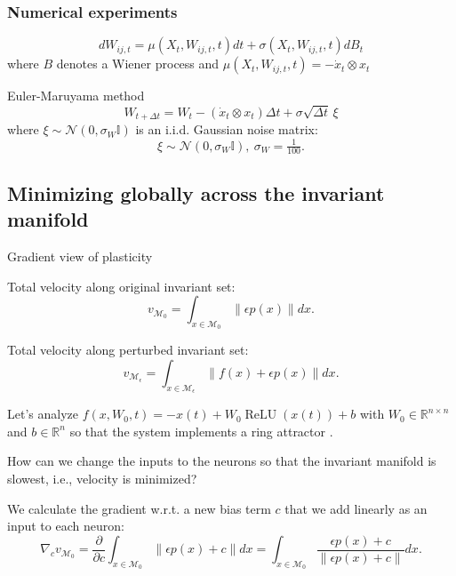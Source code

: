 \documentclass{article}
\theoremstyle{definition} \newtheorem{definition}{Definition}
\theoremstyle{remark} \newtheorem{remark}{Remark}
\newcommand{\reals}{\mathbb{R}}
\newcommand{\manifold}{\mathcal{M}}
\newcommand{\relu}{\operatorname{ReLU}}
\newcounter{ct}
\begin{document}
\subsubsection{Numerical experiments}
\begin{equation}
dW_{ij,t} = \mu(X_t, W_{ij,t}, t)dt + \sigma(X_t, W_{ij,t}, t)dB_t
\end{equation}
 where $B$ denotes a Wiener process and $ \mu(X_t, W_{ij,t}, t) = -\dot x_t \otimes x_t$

Euler-Maruyama method
\[
W_{t+\Delta t} = W_t -( \dot x_t \otimes x_t) \Delta t + \sigma \sqrt{\Delta t} \, \xi
\]
where \(\xi \sim \mathcal{N}(0, \sigma_W\mathbb{I})\) is an i.i.d. Gaussian noise matrix:
\begin{equation}
\xi \sim \mathcal{N}(0,\sigma_W\mathbb{I}), \ \sigma_W=\tfrac{1}{100}.
\end{equation}


\subsection{Minimizing globally across the invariant manifold}
Gradient view of plasticity \citep{richards2023plasticity}

Total velocity along original invariant set:
\begin{equation}
v_{\manifold_0}   = \int_{x\in\manifold_0}  \|\epsilon p(x)\|dx.
\end{equation}

Total velocity along perturbed invariant set:
\begin{equation}
v_{\manifold_\epsilon}  =\int_{x\in\manifold_\epsilon} \|f(x) + \epsilon p(x)\|dx.
\end{equation}


Let's analyze $f(x,W_0,t) = -x(t) + W_0\relu(x(t)) + b$ with $W_0\in\reals^{n\times n}$ and $b\in\reals^n$ so that the system implements a ring attractor \citep{noorman2024accurate}.


How can we change the inputs to the neurons so that the invariant manifold is slowest, i.e., velocity is minimized?

We calculate the gradient w.r.t. a new bias term $c$ that we add linearly as an input to each neuron:
\begin{equation}
\nabla_{c}v_{\manifold_0} = \frac{\partial}{\partial c}\int_{x\in\manifold_0}  \|\epsilon p(x) + c\|dx = \int_{x\in\manifold_0}  \frac{\epsilon p(x) + c}{\|\epsilon p(x) + c\|}dx.
\end{equation}
\end{document}
